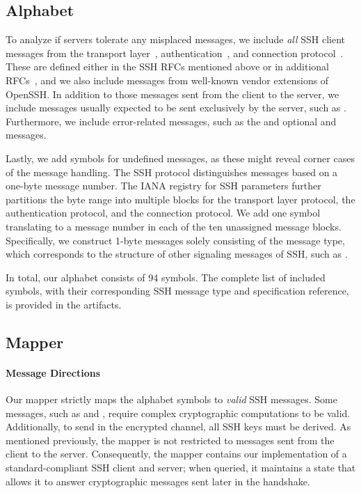 \subsection{Alphabet} 
\label{subsec:alphabet}

To analyze if servers tolerate any misplaced messages, we include \emph{all} SSH client messages from the transport layer~\cite{rfc4253}, authentication~\cite{rfc4252}, and connection protocol~\cite{rfc4254}. These are defined either in the SSH RFCs mentioned above or in additional RFCs~\cite{rfc8308, rfc4256, rfc4419, rfc4335, rfc4432, rfc5656}, and we also include messages from well-known vendor extensions of OpenSSH. In addition to those messages sent from the client to the server, we include messages usually expected to be sent exclusively by the server, such as \msgkexecdhreply. Furthermore, we include error-related messages, such as the \msgunimplemented and optional \msgignore and \msgextinfo messages. 

Lastly, we add symbols for undefined messages, as these might reveal corner cases of the message handling. The SSH protocol distinguishes messages based on a one-byte message number. The IANA registry for SSH parameters further partitions the byte range into multiple blocks for the transport layer protocol, the authentication protocol, and the connection protocol. We add one symbol translating to a message number in each of the ten unassigned message blocks. Specifically, we construct 1-byte messages solely consisting of the message type, which corresponds to the structure of other signaling messages of SSH, such as \msgnewkeys. 

In total, our alphabet consists of 94 symbols. The complete list of included symbols, with their corresponding SSH message type and specification reference, is provided in the artifacts.

\subsection{Mapper} 
\label{subsec:mapper}

\paragraph{Message Directions}

Our mapper strictly maps the alphabet symbols to \emph{valid} SSH messages. Some messages, such as \msgkexecdhinit and \msgkexecdhreply, require complex cryptographic computations to be valid. Additionally, to send \msgservicerequest in the encrypted channel, all SSH keys must be derived. As mentioned previously, the mapper is not restricted to messages sent from the client to the server. Consequently, the mapper contains our implementation of a standard-compliant SSH client and server; when queried, it maintains a state that allows it to answer cryptographic messages sent later in the handshake.

